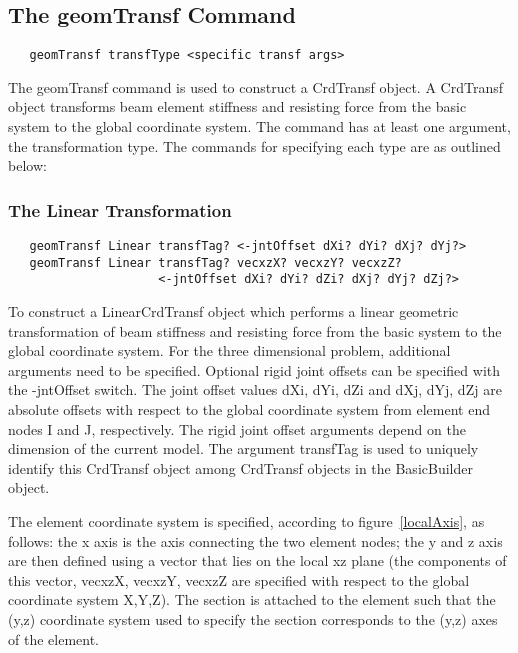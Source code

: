 \documentclass[12pt]{article}
\begin{document}
\subsection{The geomTransf Command}
{\sf\small
\begin{verbatim}
   geomTransf transfType <specific transf args>
\end{verbatim}
}

The geomTransf command is used to construct a CrdTransf object. A CrdTransf
object transforms beam element stiffness and resisting force from the 
basic system to the global coordinate system. The command has at least one 
argument, the transformation type. The commands for specifying each 
type are as outlined below: 

\subsubsection{The Linear Transformation}
{\sf\small
\begin{verbatim}
   geomTransf Linear transfTag? <-jntOffset dXi? dYi? dXj? dYj?>
   geomTransf Linear transfTag? vecxzX? vecxzY? vecxzZ?
                     <-jntOffset dXi? dYi? dZi? dXj? dYj? dZj?>
\end{verbatim}
}

To construct a LinearCrdTransf object which performs a linear geometric
transformation of beam stiffness and resisting force from the basic system
to the global coordinate system. For the three dimensional problem,
additional arguments need to be specified. Optional rigid joint
offsets can be specified with the -jntOffset switch. The joint offset
values dXi, dYi, dZi and dXj, dYj, dZj are absolute offsets with
respect to the global coordinate system from element end nodes I and
J, respectively. The rigid joint offset arguments depend on the
dimension of the current model. The argument transfTag is used to
uniquely identify this CrdTransf object among CrdTransf objects in the
BasicBuilder object. 

The element coordinate system is specified, according to
figure~\ref{localAxis}, as follows: the x axis is the axis connecting
the two element nodes; the y and z axis are then defined using a
vector that lies on the local xz plane (the components of this vector,
vecxzX, vecxzY, vecxzZ are specified with respect to the global
coordinate system X,Y,Z). The section is attached to the element such
that the (y,z) coordinate system used to specify the section
corresponds to the (y,z) axes of the element. 
\end{document}
